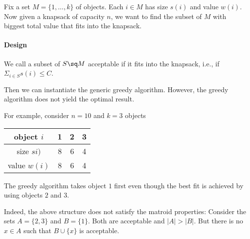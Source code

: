 Fix a set $M=\{1,\ldots,k\}$ of objects.
Each $i\in M$ has size $s(i)$ and value $w(i)$.
Now given a knapsack of capacity $n$, we want to find the subset of $M$ with biggest total value that fits into the knapsack.

\paragraph{Design}
We call a subset of $S\sq M$ acceptable if it fits into the knapsack, i.e., if $\Sigma_{i\in S}s(i)\leq C$.

Then we can instantiate the generic greedy algorithm.
However, the greedy algorithm does not yield the optimal result.

For example, consider $n=10$ and $k=3$ objects
\begin{center}
\begin{tabular}{c|ccc}
object $i$   & 1 & 2 & 3\\
\hline
size $si)$   & 8 & 6 & 4 \\
value $w(i)$ & 8 & 6 & 4
\end{tabular}
\end{center}
The greedy algorithm takes object $1$ first even though the best fit is achieved by using objects $2$ and $3$.

Indeed, the above structure does not satisfy the matroid properties:
Consider the sets $A=\{2,3\}$ and $B=\{1\}$. Both are acceptable and $|A|>|B|$.
But there is no $x\in A$ such that $B\cup\{x\}$ is acceptable.

